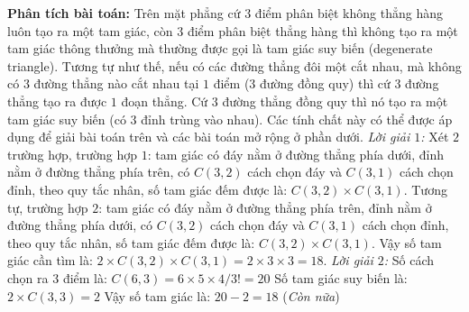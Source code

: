 \begin{multicols}{2}
\begin{figure}[H]
			\vspace*{-10pt}
		\end{figure}
	\vskip 0.1cm
	\textbf{\color{toancuabi}Phân tích bài toán:}
	\vskip 0.1cm
	Trên mặt phẳng cứ $3$ điểm phân biệt không thẳng hàng luôn tạo ra một tam giác, còn $3$ điểm phân biệt thẳng hàng thì không tạo ra một tam giác thông thưởng mà thường được gọi là tam giác suy biến (degenerate triangle). Tương tự như thế, nếu có các đường thẳng đôi một cắt nhau, mà không có $3$ đường thẳng nào cắt nhau tại $1$ điểm ($3$ đường đồng quy) thì cứ $3$ đường thẳng tạo ra được $1$ đoạn thẳng. Cứ $3$ đường thẳng đồng quy thì nó tạo ra một tam giác suy biến (có $3$ đỉnh trùng vào nhau). Các tính chất này có thể được áp dụng để giải bài toán trên và các bài toán mở rộng ở phần dưới.
	\vskip 0.1cm
	\textit{Lời giải $1$:}
	Xét $2$ trường hợp, trường hợp $1$: tam giác có đáy nằm ở đường thẳng phía dưới, đỉnh nằm ở đường thẳng phía trên, có $C(3,2)$ cách chọn đáy và $C(3,1)$ cách chọn đỉnh, theo quy tắc nhân, số tam giác đếm được là: $C(3,2)\times C(3,1)$. Tương tự, trường hợp $2$: tam giác có đáy nằm ở đường thẳng phía trên, đỉnh nằm ở đường thẳng phía dưới, có $C(3,2)$ cách chọn đáy và $C(3,1)$ cách chọn đỉnh, theo quy tắc nhân, số tam giác đếm được là: $C(3,2)\times C(3,1)$.
	\vskip 0.1cm
	Vậy số tam giác cần tìm là: $2\times C(3,2)\times C(3,1) = 2\times3\times3=18$.
	\vskip 0.1cm
	\textit{Lời giải $2$:}
	Số cách chọn ra $3$ điểm là: $C(6,3)=6\times 5\times4/3!=20$
	\vskip 0.1cm
	Số tam giác suy biến là: $2\times C(3,3)=2$
	\vskip 0.1cm
	Vậy số tam giác là: $20-2=18$
	\vskip 0.1cm
	\hfill(\textit{Còn nữa})
	\end{multicols}
